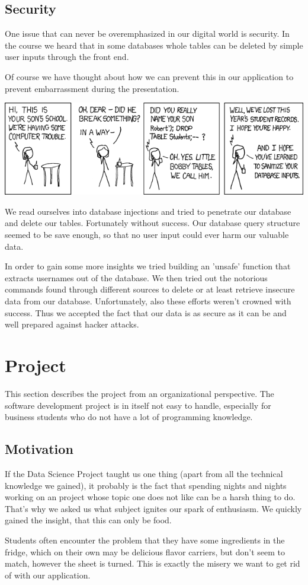 \documentclass[11pt,a4paper,notitlepage]{article}
\begin{document}
\subsection*{Security}
One issue that can never be overemphasized in our digital world is security. In the course we heard that in some databases whole tables can be deleted by simple user inputs through the front end. \par Of course we have thought about how we can prevent this in our application to prevent embarrassment during the presentation. \par
\includegraphics[scale = .5]{exploits_of_a_mom.png} \par
We read ourselves into database injections and tried to penetrate our database and delete our tables. Fortunately without success. Our database query structure seemed to be save enough, so that no user input could ever harm our valuable data. \par In order to gain some more insights we tried building an 'unsafe' function that extracts usernames out of the database. We then tried out the notorious commands found through different sources to delete or at least retrieve insecure data from our database. Unfortunately, also these efforts weren't crowned with success. Thus we accepted the fact that our data is as secure as it can be and well prepared against hacker attacks.

\newpage

\section*{Project}
This section describes the project from an organizational perspective. The software development project is in itself not easy to handle, especially for business students who do not have a lot of programming knowledge. 
\subsection*{Motivation}
If the Data Science Project taught us one thing (apart from all the technical knowledge we gained), it probably is the fact that spending nights and nights working on an project whose topic one does not like can be a harsh thing to do. That's why we asked us what subject ignites our spark of enthusiasm. We quickly gained the insight, that this can only be food. \par Students often encounter the problem that they have some ingredients in the fridge, which on their own may be delicious flavor carriers, but don't seem to match, however the sheet is turned. This is exactly the misery we want to get rid of with our application.
\end{document}
